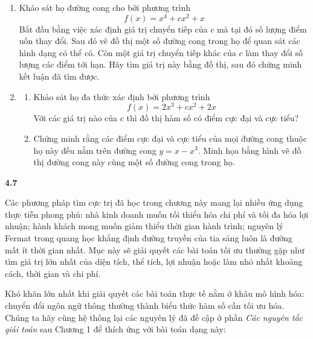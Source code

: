 \documentclass[10pt]{article}
\begin{document}
\begin{minipage}[t]{0.70\textwidth}
  \vspace{0pt}
  \begin{enumerate}[label=\bfseries\arabic*.,start=39,leftmargin=1.5em,itemsep=1.2em]
    \item Khảo sát họ đường cong cho bởi phương trình
    \[
      f(x) = x^4 + cx^2 + x
    \]
    Bắt đầu bằng việc xác định giá trị chuyển tiếp của $c$ mà tại đó số lượng điểm uốn thay đổi. Sau đó vẽ đồ thị một số đường cong trong họ để quan sát các hình dạng có thể có. Còn một giá trị chuyển tiếp khác của $c$ làm thay đổi số lượng các điểm tới hạn. Hãy tìm giá trị này bằng đồ thị, sau đó chứng minh kết luận đã tìm được.
    
    \item \begin{enumerate}[label=\bfseries(\alph*),leftmargin=1.5em]
      \item Khảo sát họ đa thức xác định bởi phương trình
      \[
        f(x) = 2x^3 + cx^2 + 2x
      \]
      Với các giá trị nào của $c$ thì đồ thị hàm số có điểm cực đại và cực tiểu?
      \item Chứng minh rằng các điểm cực đại và cực tiểu của mọi đường cong thuộc họ này đều nằm trên đường cong $y = x - x^3$. Minh họa bằng hình vẽ đồ thị đường cong này cùng một số đường cong trong họ.
    \end{enumerate}
  \end{enumerate}
  
  \vspace{1.2em}
  \noindent
  {\color{stewartblue}\LARGE\textbf{4.7}}
  \par\vspace{0.8em}
  
  Các phương pháp tìm cực trị đã học trong chương này mang lại nhiều ứng dụng thực tiễn phong phú: nhà kinh doanh muốn tối thiểu hóa chi phí và tối đa hóa lợi nhuận; hành khách mong muốn giảm thiểu thời gian hành trình; nguyên lý Fermat trong quang học khẳng định đường truyền của tia sáng luôn là đường mất ít thời gian nhất. Mục này sẽ giải quyết các bài toán tối ưu thường gặp như tìm giá trị lớn nhất của diện tích, thể tích, lợi nhuận hoặc làm nhỏ nhất khoảng cách, thời gian và chi phí.
  
  \vspace{0.6em}
  Khó khăn lớn nhất khi giải quyết các bài toán thực tế nằm ở khâu mô hình hóa: chuyển đổi ngôn ngữ thông thường thành biểu thức hàm số cần tối ưu hóa. Chúng ta hãy cùng hệ thống lại các nguyên lý đã đề cập ở phần \textit{Các nguyên tắc giải toán} sau Chương 1 để thích ứng với bài toán dạng này:
  

\end{minipage}
\end{document}
